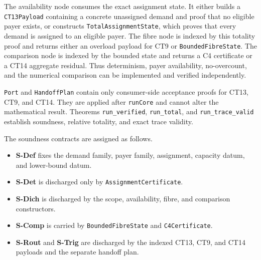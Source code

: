 \documentclass[
  11pt,
]{article}
\providecommand{\tightlist}{%
  \setlength{\itemsep}{0pt}\setlength{\parskip}{0pt}}
\theoremstyle{definition}
\begin{document}
The availability node consumes the exact assignment state.  It either builds a
\texttt{CT13Payload} containing a concrete unassigned demand and proof that no
eligible payer exists, or constructs \texttt{TotalAssignmentState}, which
proves that every demand is assigned to an eligible payer.  The fibre node is
indexed by this totality proof and returns either an overload payload for CT9
or \texttt{BoundedFibreState}.  The comparison node is indexed by the bounded
state and returns a C4 certificate or a CT14 aggregate residual.  Thus
determinism, payer availability, no-overcount, and the numerical comparison
can be implemented and verified independently.

\texttt{Port} and \texttt{HandoffPlan} contain only consumer-side acceptance
proofs for CT13, CT9, and CT14.  They are applied after \texttt{runCore} and
cannot alter the mathematical result.  Theorems \texttt{run\_verified},
\texttt{run\_total}, and \texttt{run\_trace\_valid} establish soundness,
relative totality, and exact trace validity.

The soundness contracts are assigned as follows.
\begin{itemize}
\tightlist
\item \textbf{S-Def} fixes the demand family, payer family, assignment, capacity datum, and lower-bound datum.
\item \textbf{S-Det} is discharged only by \texttt{AssignmentCertificate}.
\item \textbf{S-Dich} is discharged by the scope, availability, fibre, and comparison constructors.
\item \textbf{S-Comp} is carried by \texttt{BoundedFibreState} and \texttt{C4Certificate}.
\item \textbf{S-Rout} and \textbf{S-Trig} are discharged by the indexed CT13, CT9, and CT14 payloads and the separate handoff plan.
\end{itemize}
\end{document}
